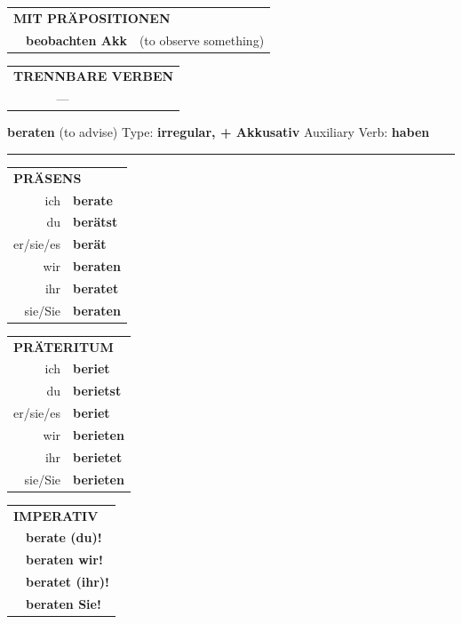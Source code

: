 \documentclass[10pt,a4paper]{revtex4-2}
\begin{document}
\begin{verbbox-acc}
\vspace{10pt}

\begin{tabular}{lll}
\multicolumn{3}{l}{\textbf{MIT PRÄPOSITIONEN}}\\
& \textbf{beobachten Akk} & (to observe something)\\
\end{tabular}
\hfill
\begin{tabular}{lll}
\multicolumn{3}{l}{\textbf{TRENNBARE VERBEN}}\\
& ---\\
\end{tabular}

\vspace{-5pt}
\end{verbbox-acc}

\begin{verbbox-acc}
{\Large \bf beraten} (to advise) \hfill Type: \textbf{irregular, + Akkusativ} \hfill Auxiliary Verb: \textbf{haben}

\vspace{5pt}
\hrule
\vspace{5pt}

\begin{tabular}{rl}
\multicolumn{2}{l}{\textbf{PRÄSENS}}\\
ich & \textbf{berate}\\
du & \textbf{berätst}\\
er/sie/es & \textbf{berät}\\
wir & \textbf{beraten}\\
ihr & \textbf{beratet}\\
sie/Sie & \textbf{beraten}\\
\end{tabular}
\hfill
\begin{tabular}{rl}
\multicolumn{2}{l}{\textbf{PRÄTERITUM}}\\
ich & \textbf{beriet}\\
du & \textbf{berietst}\\
er/sie/es & \textbf{beriet}\\
wir & \textbf{berieten}\\
ihr & \textbf{berietet}\\
sie/Sie & \textbf{berieten}\\
\end{tabular}
\hfill
\begin{tabular}{rl}
\multicolumn{2}{l}{\textbf{IMPERATIV}}\\
& \textbf{berate (du)!}\\
& \textbf{beraten wir!}\\
& \textbf{beratet (ihr)!}\\
& \textbf{beraten Sie!}\\
\end{tabular}


\end{verbbox-acc}
\end{document}
